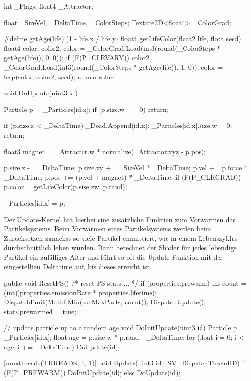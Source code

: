 \begin{hlsl}[caption=Compute Update]
int _Flags;
float4 _Attractor;

float _SizeVel, _DeltaTime, _ColorSteps;
Texture2D<float4> _ColorGrad;

#define getAge(life) (1 - life.x / life.y)
float4 getLifeColor(float2 life, float seed)
{
    float4 color, color2;
    color = _ColorGrad.Load(int3(round(_ColorSteps * getAge(life)), 0, 0));
    if (F(P_CLRVARY)) {
        color2 = _ColorGrad.Load(int3(round(_ColorSteps * getAge(life)), 1, 0));
        color = lerp(color, color2, seed);
    }
    return color;
}

void DoUpdate(uint3 id)
{
    Particle p = _Particles[id.x];
    if (p.size.w == 0) return;
    
    if (p.size.z < _DeltaTime) {
        _Dead.Append(id.x);
        _Particles[id.x].size.w = 0;
        return;
    }
    
    float3 magnet = _Attractor.w * normalize(_Attractor.xyz - p.pos);
    
    p.size.z -= _DeltaTime;
    p.size.xy += _SizeVel * _DeltaTime;
    p.vel += p.force * _DeltaTime;
    p.pos += (p.vel + magnet) * _DeltaTime;
    if (F(P_CLRGRAD)) p.color = getLifeColor(p.size.zw, p.rand);

    _Particles[id.x] = p;
}
\end{hlsl}

Der Update-Kernel hat hierbei eine zusätzliche Funktion zum Vorwärmen das Partikelsystems. Beim Vorwärmen eines Partikelsystems werden beim Zurücksetzen zunächst so viele Partikel emmittiert, wie in einem Lebenszyklus durchschnittlich leben würden. Dann berechnet der Shader für jedes lebendige Partikel ein zufälliges Alter und führt so oft die Update-Funktion mit der eingestellten Deltatime auf, bis dieses erreicht ist.

\begin{csh}[caption=Controller Reset]
public void ResetPS()
{
    /* reset PS stats ... */
    if (properties.prewarm)
    {
        int count = (int)(properties.emissionRate * properties.lifetime);
        DispatchEmit(Mathf.Min(curMaxParts, count));
        DispatchUpdate();
    }
    stats.prewarmed = true;
}
\end{csh}

\begin{hlsl}[caption=Compute Update Kernel]
// update particle up to a random age
void DoInitUpdate(uint3 id)
{
    Particle p = _Particles[id.x];
    float age = p.size.w * p.rand - _DeltaTime;
    for (float i = 0; i < age; i += _DeltaTime) DoUpdate(id);
}

[numthreads(THREADS, 1, 1)]
void Update(uint3 id : SV_DispatchThreadID)
{
    if (F(P_PREWARM)) DoInitUpdate(id);
    else DoUpdate(id);
}
\end{hlsl}

